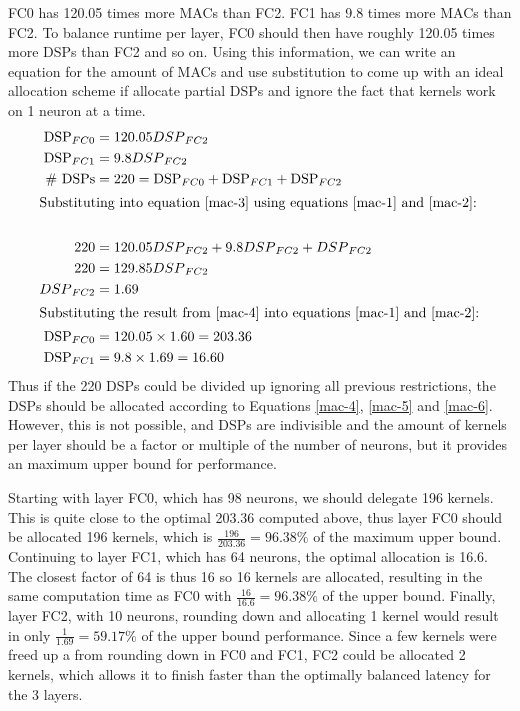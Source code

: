 FC0 has 120.05 times more MACs than FC2. FC1 has 9.8 times more MACs than FC2. To balance runtime per layer, FC0 should then have roughly 120.05 times more DSPs than FC2 and so on. Using this information, we can write an equation for the amount of MACs and use substitution to come up with an ideal allocation scheme if allocate partial DSPs and ignore the fact that kernels work on 1 neuron at a time.
\begin{align}
	\text{DSP}_{FC0} &= 120.05 {DSP}_{FC2} \label{mac-1}\\	
	\text{DSP}_{FC1} &= 9.8 {DSP}_{FC2} \label{mac-2}\\
	\text{\# DSPs} &= 220 = \text{DSP}_{FC0} + \text{DSP}_{FC1} + \text{DSP}_{FC2} \label{mac-3}\\	
	\intertext{Substituting into equation \ref{mac-3} using equations \ref{mac-1} and \ref{mac-2}:}\\
	220 &= 120.05 {DSP}_{FC2} + 9.8  {DSP}_{FC2} +  {DSP}_{FC2} \\
	220 &= 129.85 {DSP}_{FC2}\\ 
	{DSP}_{FC2} &= 1.69 \label{mac-4}\\
	\intertext{Substituting the result from \ref{mac-4} into equations \ref{mac-1} and \ref{mac-2}:}
	\text{DSP}_{FC0} &= 120.05 \times 1.60 = 203.36\label{mac-5}\\	
	\text{DSP}_{FC1} &= 9.8 \times 1.69 = 16.60\label{mac-6}	
\end{align}
Thus if the 220 DSPs could be divided up ignoring all previous restrictions, the DSPs should be allocated according to Equations \ref{mac-4}, \ref{mac-5} and \ref{mac-6}. However, this is not possible, and DSPs are indivisible and the amount of kernels per layer should be a factor or multiple of the number of neurons, but it provides an maximum upper bound for performance.

Starting with layer FC0, which has 98 neurons, we should delegate 196 kernels. This is quite close to the optimal 203.36 computed above, thus layer FC0 should be allocated 196 kernels, which is $\frac{196}{203.36} = 96.38\%$ of the maximum upper bound. Continuing to layer FC1, which has 64 neurons, the optimal allocation is 16.6. The closest factor of 64 is thus 16 so 16 kernels are allocated, resulting in the same computation time as FC0 with $\frac{16}{16.6} = 96.38\%$ of the upper bound. Finally, layer FC2, with 10 neurons, rounding down and allocating 1 kernel would result in only $\frac{1}{1.69} = 59.17\%$ of the upper bound performance. Since a few kernels were freed up a from rounding down in FC0 and FC1, FC2 could be allocated 2 kernels, which allows it to finish faster than the optimally balanced latency for the 3 layers.

